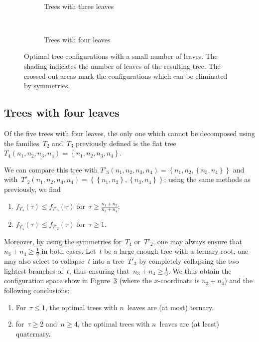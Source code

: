 \documentclass{article}
\def\treefrom#1{\left\{#1\right\}}
\begin{document}
\begin{figure}
\begin{subfigure}{.5\textwidth}
\centering\hbox{%
%
}%
\caption{Trees with three leaves}\label{fig:trees3}
\end{subfigure}
\begin{subfigure}{.5\textwidth}
\centering\hbox{%
%
}%
\caption{Trees with four leaves}\label{fig:trees4}
\end{subfigure}
\caption{Optimal tree configurations with a small number of leaves.
The shading indicates the number of leaves of the
resulting tree.
The crossed-out areas mark the configurations which can be eliminated
by symmetries.
}
\end{figure}

\subsection{Trees with four leaves}
Of the five trees with four leaves, the only one which cannot
be decomposed using the families~$T_2$ and~$T_3$ previously defined
is the flat tree~$T_4(n_1, n_2, n_3, n_4) = \treefrom{n_1, n_2, n_3, n_4}$.

We can compare this tree with
$T'_3(n_1, n_2, n_3, n_4) = \treefrom{n_1, n_2, \treefrom{n_3, n_4}}$
and with~$T'_2(n_1, n_2, n_3, n_4) = \treefrom{\treefrom{n_1, n_2},
\treefrom{n_3, n_4}}$; using the same methods as previously, we find
\begin{enumerate}
\item $f_{T_4}(τ) ≤ f_{T'_3}(τ)$ for~$τ ≥ \frac{n_1 + n_2}{n_3 + n_4}$;
\item $f_{T_4}(τ) ≤ f_{T'_2}(τ)$ for~$τ ≥ 1$.
\end{enumerate}
Moreover, by using the symmetries for~$T_4$ or~$T'_2$,
one may always ensure that~$n_3 + n_4 ≥ \frac 12$ in both cases.
Let~$t$ be a large enough tree with a ternary root,
one may also select to collapse~$t$ into a tree~$T'_3$
by completely collapsing the two lightest branches of~$t$,
thus ensuring that~$n_3 + n_4 ≥ \frac 13$.
We thus obtain the configuration space show
in Figure~\ref{fig:trees4} (where the $x$-coordinate is $n_3+n_4$)
and the following conclusions:
\begin{enumerate}
\item For~$τ ≤ 1$,
the optimal trees with $n$~leaves are (at most) ternary.
\item for~$τ ≥ 2$ and~$n ≥ 4$,
the optimal trees with $n$~leaves are (at least) quaternary.
\end{enumerate}
\end{document}

